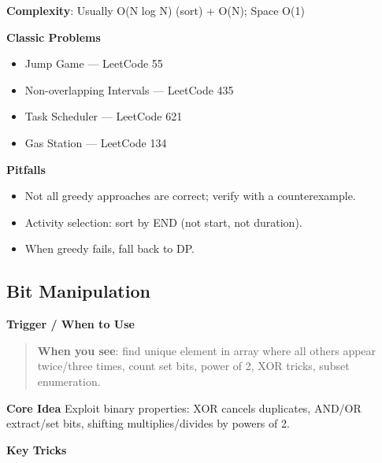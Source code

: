 \documentclass[11pt]{article}
\providecommand{\tightlist}{\setlength{\itemsep}{1pt}\setlength{\parskip}{0pt}}
\begin{document}
\textbf{Complexity}: Usually O(N log N) (sort) + O(N); Space O(1)

\textbf{Classic Problems}

\begin{itemize}
\tightlist
\item
  Jump Game --- LeetCode 55
\item
  Non-overlapping Intervals --- LeetCode 435
\item
  Task Scheduler --- LeetCode 621
\item
  Gas Station --- LeetCode 134
\end{itemize}

\textbf{Pitfalls}

\begin{itemize}
\tightlist
\item
  Not all greedy approaches are correct; verify with a counterexample.
\item
  Activity selection: sort by END (not start, not duration).
\item
  When greedy fails, fall back to DP.
\end{itemize}

\subsection{Bit Manipulation}\label{bit-manipulation}

\textbf{Trigger / When to Use}

\begin{quote}
\textbf{When you see}: find unique element in array where all others appear twice/three times, count set bits, power of 2, XOR tricks, subset enumeration.
\end{quote}

\textbf{Core Idea}
Exploit binary properties: XOR cancels duplicates, AND/OR extract/set bits, shifting multiplies/divides by powers of 2.

\textbf{Key Tricks}

\end{document}
